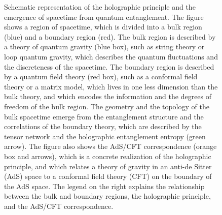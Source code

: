 \begin{figure}[h]
\centering
{}
\caption{Schematic representation of the holographic principle and the emergence of spacetime from quantum entanglement. The figure shows a region of spacetime, which is divided into a bulk region (blue) and a boundary region (red). The bulk region is described by a theory of quantum gravity (blue box), such as string theory or loop quantum gravity, which describes the quantum fluctuations and the discreteness of the spacetime. The boundary region is described by a quantum field theory (red box), such as a conformal field theory or a matrix model, which lives in one less dimension than the bulk theory, and which encodes the information and the degrees of freedom of the bulk region. The geometry and the topology of the bulk spacetime emerge from the entanglement structure and the correlations of the boundary theory, which are described by the tensor network and the holographic entanglement entropy (green arrow). The figure also shows the AdS/CFT correspondence (orange box and arrows), which is a concrete realization of the holographic principle, and which relates a theory of gravity in an anti-de Sitter (AdS) space to a conformal field theory (CFT) on the boundary of the AdS space. The legend on the right explains the relationship between the bulk and boundary regions, the holographic principle, and the AdS/CFT correspondence.}
\label{fig:holographic_principle}
\end{figure}

